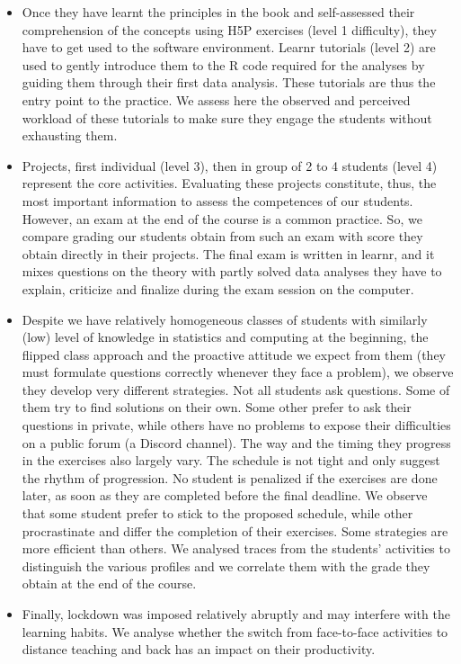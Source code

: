 \documentclass[
]{article}
\begin{document}
\begin{itemize}
\item
  Once they have learnt the principles in the book and self-assessed
  their comprehension of the concepts using H5P exercises (level 1
  difficulty), they have to get used to the software environment. Learnr
  tutorials (level 2) are used to gently introduce them to the R code
  required for the analyses by guiding them through their first data
  analysis. These tutorials are thus the entry point to the practice. We
  assess here the observed and perceived workload of these tutorials to
  make sure they engage the students without exhausting them.
\item
  Projects, first individual (level 3), then in group of 2 to 4 students
  (level 4) represent the core activities. Evaluating these projects
  constitute, thus, the most important information to assess the
  competences of our students. However, an exam at the end of the course
  is a common practice. So, we compare grading our students obtain from
  such an exam with score they obtain directly in their projects. The
  final exam is written in learnr, and it mixes questions on the theory
  with partly solved data analyses they have to explain, criticize and
  finalize during the exam session on the computer.
\item
  Despite we have relatively homogeneous classes of students with
  similarly (low) level of knowledge in statistics and computing at the
  beginning, the flipped class approach and the proactive attitude we
  expect from them (they must formulate questions correctly whenever
  they face a problem), we observe they develop very different
  strategies. Not all students ask questions. Some of them try to find
  solutions on their own. Some other prefer to ask their questions in
  private, while others have no problems to expose their difficulties on
  a public forum (a Discord channel). The way and the timing they
  progress in the exercises also largely vary. The schedule is not tight
  and only suggest the rhythm of progression. No student is penalized if
  the exercises are done later, as soon as they are completed before the
  final deadline. We observe that some student prefer to stick to the
  proposed schedule, while other procrastinate and differ the completion
  of their exercises. Some strategies are more efficient than others. We
  analysed traces from the students' activities to distinguish the
  various profiles and we correlate them with the grade they obtain at
  the end of the course.
\item
  Finally, lockdown was imposed relatively abruptly and may interfere
  with the learning habits. We analyse whether the switch from
  face-to-face activities to distance teaching and back has an impact on
  their productivity.
\end{itemize}
\end{document}
